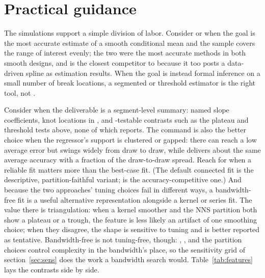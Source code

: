 \section{Practical guidance}
\label{sec:practice}

The simulations support a simple division of labor.  Consider
 or  when the goal is the most
accurate estimate of a smooth conditional mean and the sample covers the range
of interest evenly; the two were the most accurate methods in both smooth
designs, and  is the closest competitor to
 because it too posts a data-driven spline as estimation
results.  When the goal is instead formal inference on a small number of
break locations, a segmented or threshold estimator is the right tool, not
.

Consider  when the deliverable is a segment-level summary:
named slope coefficients, knot locations in , and
-testable contrasts such as the plateau and threshold tests
above, none of which  reports.  The command is also the
better choice when the regressor's support is clustered or gapped: there
 can reach a low average error but swings widely from
draw to draw, while  delivers about the same average
accuracy with a fraction of the draw-to-draw spread.  Reach for
 when a reliable fit matters more than the best-case fit.  (The default
connected fit is the descriptive, partition-faithful variant;
 is the accuracy-competitive one.)  And because the two
approaches' tuning choices fail in different ways, a bandwidth-free
 fit is a useful alternative representation alongside a kernel or
series fit.  The value there is triangulation: when a kernel smoother and the
NNS partition both show a plateau or a trough, the feature is less likely an
artifact of one smoothing choice; when they disagree, the shape is sensitive
to tuning and is better reported as tentative.  Bandwidth-free is not
tuning-free, though: , , and the partition
choices control complexity in the bandwidth's place, so the sensitivity grid
of section~\ref{sec:sens} does the work a bandwidth search would.
Table~\ref{tab:features} lays the contrasts side by side.

